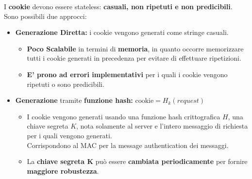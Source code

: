 \begin{corollary}
I \textbf{cookie} devono essere stateless: \textbf{casuali, non ripetuti e non predicibili}. Sono possibili due approcci:
\begin{itemize}
    \item \textbf{Generazione Diretta:} i cookie vengono generati come stringe casuali.
    \begin{itemize}
        \item \textbf{Poco Scalabile} in termini di \textbf{memoria}, in quanto occorre memorizzare tutti i cookie generati in precedenza per evitare di effettuare ripetizioni.
        \item \textbf{E' prono ad errori implementativi} per i quali i cookie vengono ripetuti o sono predicibili.
    \end{itemize}
    \item \textbf{Generazione} tramite \textbf{funzione hash:} $\text{cookie}=H_k(request)$
    \begin{itemize}
        \item I cookie vengono generati usando una funzione hash crittografica $H$, una chiave segreta $K$, nota solamente al server e l'intero messaggio di richiesta per i quali vengono generati.\\
        Corrispondono al MAC per la message authentication dei messaggi.
        \item La \textbf{chiave segreta K} può essere \textbf{cambiata periodicamente} per fornire \textbf{maggiore robustezza}.
    \end{itemize}
\end{itemize}
\end{corollary} 
